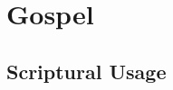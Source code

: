 \section{Gospel}
	\label{GOSPEL}
	





\subsection{Scriptural Usage} %
	\label{GOSPEL-SCRIPTURES}

	
	
